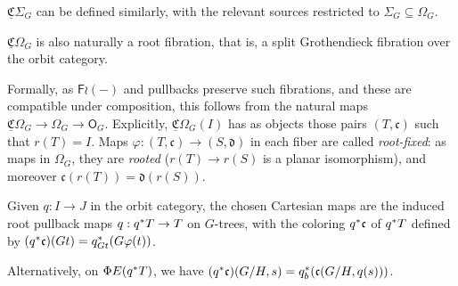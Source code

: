 \documentclass[a4paper,10pt
,draft
]{article}%
\renewcommand{\phi}{\varphi}
\newcommand{\UC}{\underline{\mathfrak C}}
\renewcommand{\1}{\ensuremath{\mathbb{id}}}
\begin{document}
\begin{remark}
{        $\UC \Sigma_G$ can be defined similarly, with the relevant sources restricted to
        $\Sigma_G \subseteq \Omega_G$. 
      }
\end{remark}


\begin{remark}
      $\underline{\mathfrak C}\Omega_G$ is also naturally a root fibration, 
      that is, a split Grothendieck fibration over the orbit category.

      Formally, as $\mathsf F \wr (-)$ and pullbacks preserve such fibrations, and these are compatible under composition,
      this follows from the natural maps $\underline{\mathfrak C}\Omega_G \to \Omega_G \to \mathsf O_G$.
      Explicitly, $\underline{\mathfrak C}\Omega_G(I)$ has as objects those pairs $(T,\mathfrak c)$ such that
      $r(T) = I$. 
      Maps $\phi:(T,\mathfrak c) \to (S, \mathfrak d)$ in each fiber are called \textit{root-fixed}:
      as maps in $\Omega_G$, they are \textit{rooted} ($r(T) \to r(S)$ is a planar isomorphism),
      and moreover $\mathfrak c(r(T)) = \mathfrak d(r(S))$.
      
      Given $q: I \to J$ in the orbit category,
      the chosen Cartesian maps are the induced root pullback maps $q: q^{\**}T \to T$ on $G$-trees,
      with the coloring $q^{\**}\mathfrak c$ of $q^{\**}T$ defined by
      $(q^{\**}\mathfrak c)(G t) = q_{G t}^{\**}(G \phi(t))$.

      {\color{blue} %
        Alternatively, on $\Phi E(q^{\**} T)$, we have
        $(q^{\**}\mathfrak c)(G/H, s) = q_b^{\**}(\mathfrak c(G/H, q(s)))$.
      } %
\end{remark}
\end{document}
